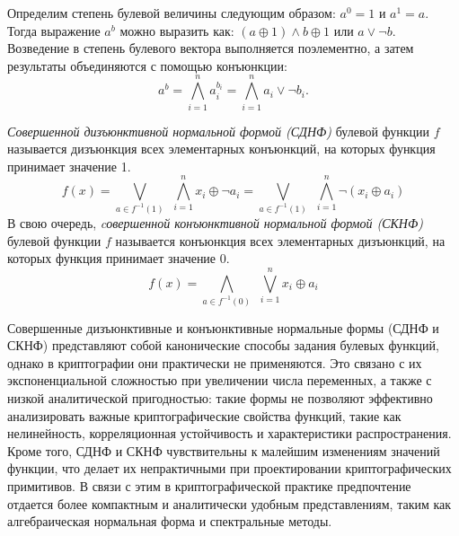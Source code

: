 Определим степень булевой величины следующим образом: $a^0 = 1$ и $a^1 = a$. Тогда выражение $a^b$ можно выразить как: $(a \oplus 1) \wedge b \oplus 1$ или \mbox{$a \vee \neg b$}. Возведение в степень булевого вектора выполняется поэлементно, а затем результаты объединяются с помощью конъюнкции:
\[
    a^b = \bigwedge_{i=1}^{n} a_i^{b_i} = \bigwedge_{i=1}^n a_i \vee \neg b_i.
\]

\textit{Совершенной дизъюнктивной нормальной формой (СДНФ)} булевой функции $f$ называется дизъюнкция  всех элементарных конъюнкций, на которых функция принимает значение 1.
\[
f(x) = \bigvee_{a\in f^{-1}(1)}  \ \  \bigwedge_{i=1}^n x_i \oplus \neg a_i = \bigvee_{a\in f^{-1}(1)}  \ \  \bigwedge_{i=1}^n\neg (x_i \oplus a_i)
\]
В свою очередь, \textit{cовершенной конъюнктивной нормальной формой (СКНФ)} булевой функции $f$ называется конъюнкция всех элементарных дизъюнкций, на которых функция принимает значение 0.
\[
f(x) = \bigwedge_{a\in f^{-1}(0)}  \ \ \bigvee_{i=1}^n x_i \oplus a_i
\]



Совершенные дизъюнктивные и конъюнктивные нормальные формы (СДНФ и СКНФ) представляют собой канонические способы задания булевых функций, однако в криптографии они практически не применяются. Это связано с их экспоненциальной сложностью при увеличении числа переменных, а также с низкой аналитической пригодностью: такие формы не позволяют эффективно анализировать важные криптографические свойства функций, такие как нелинейность, корреляционная устойчивость и характеристики распространения. Кроме того, СДНФ и СКНФ чувствительны к малейшим изменениям значений функции, что делает их непрактичными при проектировании криптографических примитивов. В связи с этим в криптографической практике предпочтение отдается более компактным и аналитически удобным представлениям, таким как алгебраическая нормальная форма и спектральные методы.


